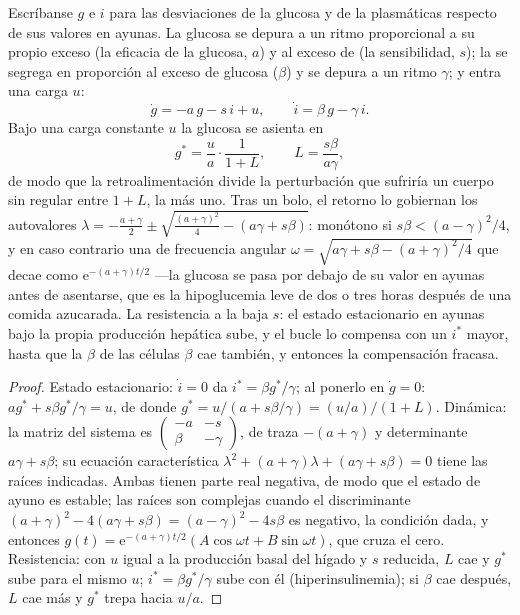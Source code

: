 \begin{theorem}\label{thm:b3:endocrinology:loop}
Escríbanse $g$ e $i$ para las desviaciones de la glucosa y de la
 plasmáticas respecto de sus valores en ayunas. La glucosa se
depura a un ritmo proporcional a su propio exceso (la eficacia de la
glucosa, $a$) y al exceso de  (la sensibilidad, $s$); la
 se segrega en proporción al exceso de glucosa ($\beta$) y se
depura a un ritmo $\gamma$; y entra una carga $u$:
\[
\dot g = -a\,g - s\,i + u, \qquad \dot i = \beta\,g - \gamma\,i .
\]
Bajo una carga constante $u$ la glucosa se asienta en
\[
g^{*} = \frac{u}{a}\cdot\frac{1}{1 + L}, \qquad L = \frac{s\beta}{a\gamma},
\]
de modo que la retroalimentación divide la perturbación que sufriría un
cuerpo sin regular entre $1 + L$, la \emph{} más uno.
Tras un bolo, el retorno lo gobiernan los autovalores
$\lambda = -\tfrac{a + \gamma}{2} \pm \sqrt{\tfrac{(a+\gamma)^{2}}{4} - (a\gamma + s\beta)}$:
monótono si $s\beta < (a - \gamma)^{2}/4$, y en caso contrario una
 de frecuencia angular $\omega = \sqrt{a\gamma + s\beta -
(a+\gamma)^{2}/4}$ que decae como $\mathrm{e}^{-(a+\gamma)t/2}$ ---la
glucosa se pasa por debajo de su valor en ayunas antes de asentarse,
que es la hipoglucemia leve de dos o tres horas después de una comida
azucarada. La resistencia a la  baja $s$: el estado
estacionario en ayunas bajo la propia producción hepática sube, y el
bucle lo compensa con un $i^{*}$ mayor, hasta que la $\beta$ de las
células $\beta$ cae también, y entonces la compensación fracasa.
\end{theorem}
\begin{proof}
Estado estacionario: $\dot i = 0$ da $i^{*} = \beta g^{*}/\gamma$; al
ponerlo en $\dot g = 0$: $a g^{*} + s\beta g^{*}/\gamma = u$, de donde $g^{*} =
u/(a + s\beta/\gamma) = (u/a)/(1 + L)$. Dinámica: la matriz del sistema
es $\begin{pmatrix} -a & -s\\ \beta & -\gamma\end{pmatrix}$, de traza
$-(a+\gamma)$ y determinante $a\gamma + s\beta$; su ecuación
característica $\lambda^{2} + (a+\gamma)\lambda + (a\gamma + s\beta) = 0$
tiene las raíces indicadas. Ambas tienen parte real negativa, de modo
que el estado de ayuno es estable; las raíces son complejas cuando el
discriminante $(a+\gamma)^{2}
- 4(a\gamma + s\beta) = (a-\gamma)^{2} - 4s\beta$ es negativo, la
condición dada, y entonces $g(t) = \mathrm{e}^{-(a+\gamma)t/2}(A\cos\omega t
+ B\sin\omega t)$, que cruza el cero. Resistencia: con $u$ igual a la
producción basal del hígado y $s$ reducida, $L$ cae y $g^{*}$ sube para
el mismo $u$; $i^{*} = \beta g^{*}/\gamma$ sube con él
(hiperinsulinemia); si $\beta$ cae después, $L$ cae más y $g^{*}$ trepa
hacia $u/a$.
\end{proof}

